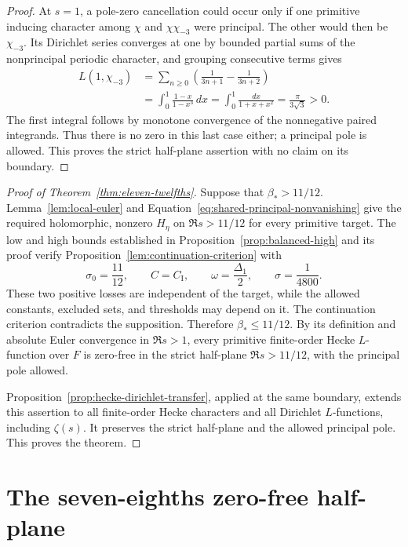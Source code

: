 \documentclass[11pt,a4paper]{article}
\numberwithin{equation}{section}
\numberwithin{figure}{section}
\theoremstyle{definition}
\theoremstyle{remark}
\begin{document}
\begin{proof}
At $s=1$, a pole-zero cancellation could occur only if one primitive
inducing character among $\chi$ and $\chi\chi_{-3}$ were principal.  The
other would then be $\chi_{-3}$.  Its Dirichlet series converges at one
by bounded partial sums of the nonprincipal periodic character, and
grouping consecutive terms gives
\[
 \begin{split}
 L(1,\chi_{-3})
 &=\sum_{n\ge0}\left(\frac1{3n+1}-\frac1{3n+2}\right)\\
 &=\int_0^1\frac{1-x}{1-x^3}\,dx
   =\int_0^1\frac{dx}{1+x+x^2}
   =\frac{\pi}{3\sqrt3}>0.
 \end{split}
\]
The first integral follows by monotone convergence of the nonnegative
paired integrands.  Thus there is no zero in this last case either; a
principal pole is allowed.  This proves the strict half-plane assertion
with no claim on its boundary.
\end{proof}

\begin{proof}[Proof of Theorem~\ref{thm:eleven-twelfths}]
Suppose that $\beta_*>11/12$.  Lemma~\ref{lem:local-euler} and
Equation~\eqref{eq:shared-principal-nonvanishing} give the required
holomorphic, nonzero $H_\eta$ on $\Re s>11/12$ for every
primitive target.  The low and high bounds established in
Proposition~\ref{prop:balanced-high} and its proof verify
Proposition~\ref{lem:continuation-criterion} with
\[
 \sigma_0=\frac{11}{12},\qquad C=C_{\mathrm I},\qquad
 \omega=\frac{\Delta_1}{2},\qquad \sigma=\frac1{4800}.
\]
These two positive losses are independent of the target, while the allowed
constants, excluded sets, and thresholds may depend on it.  The continuation
criterion contradicts the supposition.  Therefore $\beta_*\le11/12$.
By its definition and absolute Euler convergence in $\Re s>1$, every
primitive finite-order Hecke $L$-function over $F$ is zero-free in the strict
half-plane $\Re s>11/12$, with the principal pole allowed.

Proposition~\ref{prop:hecke-dirichlet-transfer}, applied at the same boundary,
extends this assertion to all finite-order Hecke characters and all Dirichlet
$L$-functions, including $\zeta(s)$.  It preserves the strict half-plane and
the allowed principal pole.  This proves the theorem.
\end{proof}

\part{The seven-eighths zero-free half-plane}
\label{part:seven-eighths}
\end{document}
